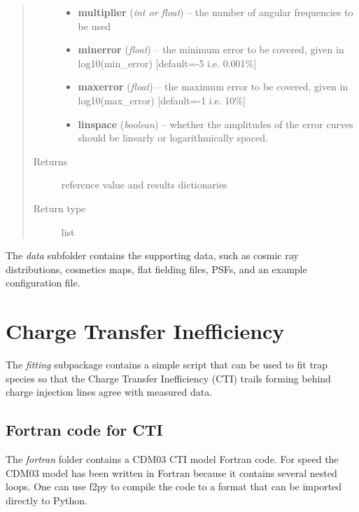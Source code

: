 \documentclass[a4paper,11pt,english]{sphinxmanual}
\begin{document}
\begin{fulllineitems}
\begin{quote}
\begin{description}
\begin{itemize}
\item {} 
\textbf{multiplier} (\emph{int or float}) -- the number of angular frequencies to be used

\item {} 
\textbf{minerror} (\emph{float}) -- the minimum error to be covered, given in log10(min\_error) {[}default=-5 i.e. 0.001\%{]}

\item {} 
\textbf{maxerror} (\emph{float}) -- the maximum error to be covered, given in log10(max\_error) {[}default=-1 i.e. 10\%{]}

\item {} 
\textbf{linspace} (\emph{boolean}) -- whether the amplitudes of the error curves should be linearly or logarithmically spaced.

\end{itemize}

\item[{Returns}] \leavevmode
reference value and results dictionaries

\item[{Return type}] \leavevmode
list

\end{description}\end{quote}

\end{fulllineitems}


The \emph{data} subfolder contains the supporting data, such as cosmic ray distributions, cosmetics maps,
flat fielding files, PSFs, and an example configuration file.


\chapter{Charge Transfer Inefficiency}
\label{index:charge-transfer-inefficiency}
The \emph{fitting} subpackage contains a simple script that can be used to fit trap species so that the
Charge Transfer Inefficiency (CTI) trails forming behind charge injection lines agree with measured data.


\section{Fortran code for CTI}
\label{index:fortran-code-for-cti}
The \emph{fortran} folder contains a CDM03 CTI model Fortran code. For speed the CDM03 model has been written in Fortran
because it contains several nested loops. One can use f2py to compile the code to a format that can be imported
directly to Python.
\end{document}
